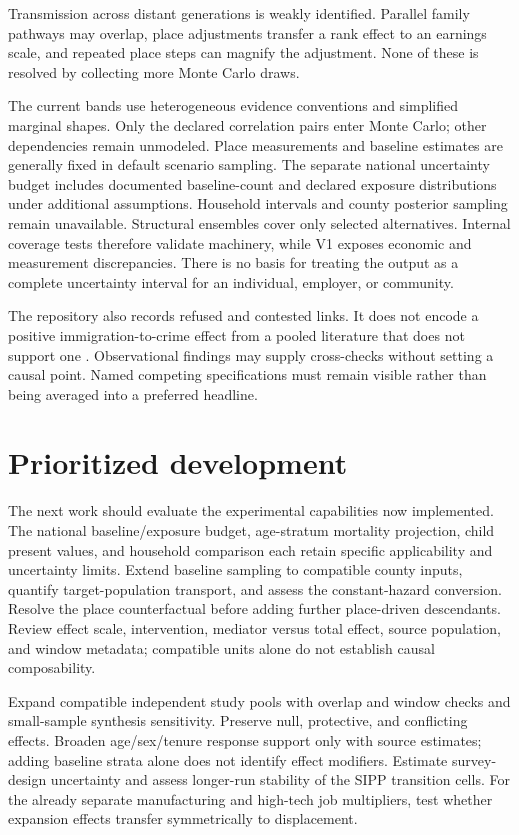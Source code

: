 \documentclass[10pt]{article}
\begin{document}
Transmission across distant generations is weakly identified. Parallel
family pathways may overlap, place adjustments transfer a rank effect to
an earnings scale, and repeated place steps can magnify the adjustment.
None of these is resolved by collecting more Monte Carlo draws.

The current bands use heterogeneous evidence conventions and simplified
marginal shapes. Only the declared correlation pairs enter Monte Carlo; other dependencies
remain unmodeled. Place measurements and baseline estimates are generally
fixed in default scenario sampling. The separate national uncertainty
budget includes documented baseline-count and declared exposure
distributions under additional assumptions. Household intervals and
county posterior sampling remain unavailable. Structural ensembles cover only
selected alternatives. Internal coverage tests therefore validate
machinery, while V1 exposes economic and measurement discrepancies.
There is no basis for treating the output as a complete uncertainty
interval for an individual, employer, or community.

The repository also records refused and contested links. It does not
encode a positive immigration-to-crime effect from a pooled literature
that does not support one \cite{ousey2018,butcher1998}. Observational
findings may supply cross-checks without setting a causal point.
Named competing specifications must remain visible rather than being
averaged into a preferred headline.

\section{Prioritized development}
The next work should evaluate the experimental capabilities now implemented.
The national baseline/exposure budget, age-stratum mortality projection,
child present values, and household comparison each retain specific
applicability and uncertainty limits. Extend baseline sampling to compatible
county inputs, quantify target-population transport, and assess the
constant-hazard conversion. Resolve the place counterfactual before adding
further place-driven descendants. Review effect scale, intervention,
mediator versus total effect, source population, and window metadata;
compatible units alone do not establish causal composability.

Expand compatible independent study pools with overlap and window checks
and small-sample synthesis sensitivity. Preserve null, protective, and
conflicting effects. Broaden age/sex/tenure response support only with source
estimates; adding baseline strata alone does not identify effect modifiers.
Estimate survey-design uncertainty and assess longer-run stability of the
SIPP transition cells. For the already separate manufacturing and high-tech
job multipliers, test whether expansion effects transfer symmetrically to
displacement.
\end{document}
